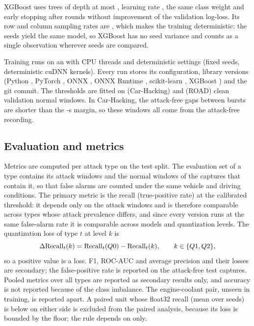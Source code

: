 XGBoost uses \XGBEstimators{} trees of depth at most \XGBDepth, learning rate \XGBLR, the same class weight and
early stopping after \XGBEarlyStop{} rounds without improvement of the validation log-loss. Its row and column
sampling rates are \XGBSubsample, which makes the training deterministic: the \NSeeds{} seeds yield the same model,
so XGBoost has no seed variance and counts as a single observation wherever seeds are compared.

Training runs on an \GPUName{} with \TrainThreads{} CPU threads and deterministic settings (fixed seeds,
deterministic cuDNN kernels). Every run stores its configuration, library versions (Python \PythonVersion, PyTorch
\TorchVersion, ONNX \ONNXVersion, ONNX Runtime \ORTVersion, scikit-learn \SklearnVersion, XGBoost \XGBVersion) and
the git commit. The thresholds are fitted on \CalibNormalsCH{} (Car-Hacking) and \CalibNormalsROAD{} (ROAD) clean
validation normal windows. In Car-Hacking, the attack-free gaps between bursts are shorter than the
\NormalMarginS-s margin, so these windows all come from the attack-free recording.

\subsection{Evaluation and metrics}
Metrics are computed per attack type on the test split. The evaluation set of a type contains its attack windows
and the normal windows of the captures that contain it, so that false alarms are counted under the same vehicle
and driving conditions. The primary metric is the recall (true-positive rate) at the calibrated threshold: it
depends only on the attack windows and is therefore comparable across types whose attack prevalence differs, and
since every version runs at the same false-alarm rate it is comparable across models and quantization levels. The
quantization loss of type $t$ at level $k$ is
\begin{equation}
\Delta\mathrm{Recall}_t(k) = \mathrm{Recall}_t(Q0) - \mathrm{Recall}_t(k),\qquad k \in \{Q1, Q2\},
\end{equation}
so a positive value is a loss. F1, ROC-AUC and average precision and their losses are secondary; the false-positive
rate is reported on the attack-free test captures. Pooled metrics over all types are reported as secondary
results only, and accuracy is not reported because of the class imbalance. The engine-coolant pair, unseen in
training, is reported apart. A paired unit whose float32 recall (mean over seeds) is below \FloorRecall{} on either
side is excluded from the paired analysis, because its loss is bounded by the floor; the rule depends on \Qfp{}
only.

